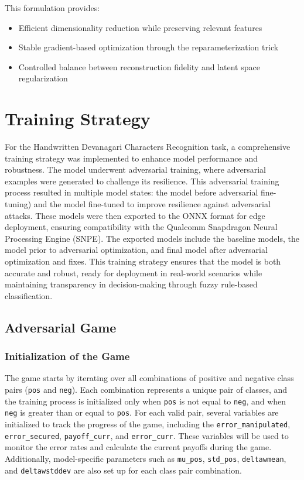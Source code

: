 \documentclass[9pt,a4paper,twoside]{rho-class/rho}
\begin{document}
This formulation provides:
\begin{itemize}
\item Efficient dimensionality reduction while preserving relevant features \cite{bengio2013representation}
\item Stable gradient-based optimization through the reparameterization trick
\item Controlled balance between reconstruction fidelity and latent space regularization
\end{itemize}






\section{Training Strategy}
 For the Handwritten Devanagari Characters Recognition task, a comprehensive training strategy was implemented to enhance model performance and robustness. The model underwent adversarial training, where adversarial examples were generated to challenge its resilience. This adversarial training process resulted in multiple model states: the model before adversarial fine-tuning) and the model fine-tuned to improve resilience against adversarial attacks. These models were then exported to the ONNX format for edge deployment, ensuring compatibility with the Qualcomm Snapdragon Neural Processing Engine (SNPE). The exported models include the baseline models, the model prior to adversarial optimization, and final model after adversarial optimization and fixes. This training strategy ensures that the model is both accurate and robust, ready for deployment in real-world scenarios while maintaining transparency in decision-making through fuzzy rule-based classification.

 \subsection{Adversarial Game}
 
\subsubsection{Initialization of the Game}
The game starts by iterating over all combinations of positive and negative class pairs (\texttt{pos} and \texttt{neg}). Each combination represents a unique pair of classes, and the training process is initialized only when \texttt{pos} is not equal to \texttt{neg}, and when \texttt{neg} is greater than or equal to \texttt{pos}. For each valid pair, several variables are initialized to track the progress of the game, including the \texttt{error\_manipulated}, \texttt{error\_secured}, \texttt{payoff\_curr}, and \texttt{error\_curr}. These variables will be used to monitor the error rates and calculate the current payoffs during the game. Additionally, model-specific parameters such as \texttt{mu\_pos}, \texttt{std\_pos}, \texttt{deltawmean}, and \texttt{deltawstddev} are also set up for each class pair combination.
\end{document}
